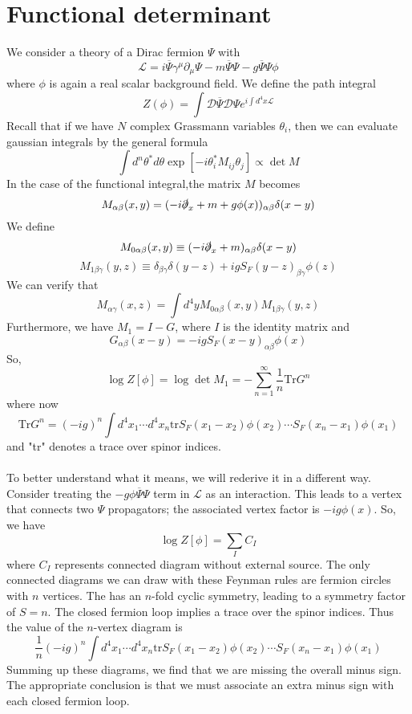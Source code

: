 \documentclass[cyan]{elegantnote}
\begin{document}
\section{Functional determinant}
We consider a theory of a Dirac fermion $\Psi$ with
\[\mathcal{L} = i\overline{\Psi} \gamma^{\mu} \partial_{\mu} \Psi - m\overline{\Psi}\Psi -g \overline{\Psi}\Psi\phi\]
where $\phi$ is again a real scalar background field. We define the path integral
\[Z(\phi) = \int \mathcal{D}\overline{\Psi}\mathcal{D}\Psi e^{i\int d^4x \mathcal{L}} \]
Recall that if we have $N$ complex Grassmann variables $\theta_i$, then we can evaluate gaussian integrals by the general formula
\[\int d^n\theta^* d\theta \exp[-i\theta^{*}_i M_{ij}\theta_j] \propto \det M\]
In the case of the functional integral,the matrix $M$ becomes
\[M_{\alpha\beta}(x,y) = (-i\slashed{\partial}_x + m + g\phi(x))_{\alpha\beta}\delta(x-y)\]
We define
\[M_{0\alpha\beta}(x,y) \equiv (-i\slashed{\partial}_x + m )_{\alpha\beta}\delta(x-y)\]
\[M_{1\beta\gamma}(y,z) \equiv \delta_{\beta\gamma}\delta(y-z) + igS_{F}(y-z)_{\beta\gamma}\phi(z)\]
We can verify that
\[M_{\alpha\gamma}(x,z) = \int d^4y M_{0\alpha\beta}(x,y)M_{1\beta\gamma}(y,z) \]
Furthermore, we have $M_1 = I - G$, where $I$ is the identity matrix and
\[G_{\alpha\beta}(x-y) = -igS_{F}(x-y)_{\alpha\beta}\phi(x)\]
So, 
\[\log Z[\phi] = \log \det M_1 = -\sum_{n=1}^{\infty} \frac{1}{n} \mathrm{Tr}G^n\]
where now
\[\mathrm{Tr}G^n = (-ig)^n \int d^4x_1 \cdots d^4x_n \mathrm{tr} S_F(x_1-x_2)\phi(x_2) \cdots S_F(x_n-x_1)\phi(x_1)\]
and "tr" denotes a trace over spinor indices.
\\ \\
To better understand what it means, we will rederive it in a different way. 
Consider treating the $-g\phi\overline{\Psi}\Psi$ term in $\mathcal{L}$ as an interaction. This leads to a vertex that connects two $\Psi$ propagators; the associated vertex factor
is $-ig\phi(x)$. 
So, we have
\[\log Z[\phi] = \sum_{I}C_I\]
where $C_I$ represents connected diagram without external source. The only connected diagrams we can draw with these Feynman rules are fermion circles with $n$ vertices. 
The has an $n$-fold cyclic symmetry, leading to a symmetry factor of $S= n$. The closed fermion loop implies a trace over the spinor indices. Thus the value of the $n$-vertex diagram is
\[\frac{1}{n}(-ig)^n \int d^4x_1 \cdots d^4x_n \mathrm{tr} S_F(x_1-x_2)\phi(x_2) \cdots S_F(x_n-x_1)\phi(x_1)\]
Summing up these diagrams, we find that we are missing the overall minus sign. The appropriate conclusion is that we must associate an extra minus sign with each closed fermion loop.
\end{document}
